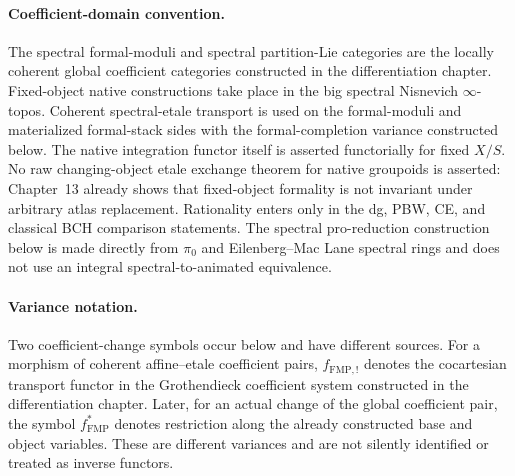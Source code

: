 \paragraph{Coefficient-domain convention.}
The spectral formal-moduli and spectral partition-Lie categories are the
locally coherent global coefficient categories constructed in the
differentiation chapter.  Fixed-object native constructions take place in the
big spectral Nisnevich $\infty$-topos.  Coherent spectral-etale transport is
used on the formal-moduli and materialized formal-stack sides with the
formal-completion variance constructed below.  The native integration functor
itself is asserted functorially for fixed $X/S$.  No raw changing-object etale
exchange theorem for native groupoids is asserted: Chapter~13 already shows
that fixed-object formality is not invariant under arbitrary atlas
replacement.  Rationality enters only in the dg, PBW, CE, and classical BCH
comparison statements.  The spectral pro-reduction construction below is made
directly from $\pi_0$ and Eilenberg--Mac Lane spectral rings and does not use
an integral spectral-to-animated equivalence.

\paragraph{Variance notation.}
Two coefficient-change symbols occur below and have different sources.  For a
morphism of coherent affine--etale coefficient pairs,
\(f_{\mathrm{FMP},!}\) denotes the cocartesian transport functor in the
Grothendieck coefficient system constructed in the differentiation chapter.
Later, for an actual change of the global coefficient pair, the symbol
\(f_{\mathrm{FMP}}^*\) denotes restriction along the already constructed base
and object variables.  These are different variances and are not silently
identified or treated as inverse functors.


